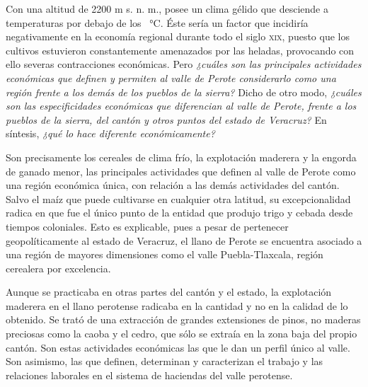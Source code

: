 \documentclass[14pt,twoside,final]{extbook} %
\begin{document}
Con una altitud de 2200 m s. n. m., posee un clima gélido que desciende a temperaturas por debajo de los ~°C. Éste sería un factor que incidiría negativamente en la economía regional durante todo el siglo \textsc{xix}, puesto que los cultivos estuvieron constantemente amenazados por las heladas, provocando con ello severas contracciones económicas. Pero \emph{¿cuáles son las principales
actividades económicas que definen y permiten al valle de Perote considerarlo como una región frente a los demás de los pueblos de la sierra?} Dicho de otro modo, \emph{¿cuáles son las especificidades económicas que diferencian al valle de Perote, frente a los pueblos de la sierra, del cantón y otros puntos del estado de Veracruz?} En síntesis, \emph{¿qué lo hace diferente económicamente?}

Son precisamente los cereales de clima frío, la explotación maderera y la engorda de ganado menor, las principales actividades que definen al valle de Perote como una región económica única, con relación a las demás actividades del cantón. Salvo el maíz que puede cultivarse en cualquier otra latitud, su excepcionalidad radica en que fue el único punto de la entidad que produjo trigo y cebada desde tiempos coloniales. Esto es explicable, pues a pesar de pertenecer geopolíticamente al estado de Veracruz, el llano de Perote se encuentra asociado a una región de mayores dimensiones como el valle Puebla-Tlaxcala, región cerealera por excelencia.

Aunque se practicaba en otras partes del cantón y el estado, la explotación maderera en el llano perotense radicaba en la cantidad y no en la calidad de lo obtenido. Se trató de una extracción de grandes extensiones de pinos, no maderas preciosas como la caoba y el cedro, que sólo se extraía en la zona baja del propio cantón. Son estas actividades económicas las que le dan un perfil único al valle. Son asimismo, las que definen, determinan y caracterizan el trabajo y las relaciones laborales en el sistema de haciendas del valle perotense.
\end{document}
